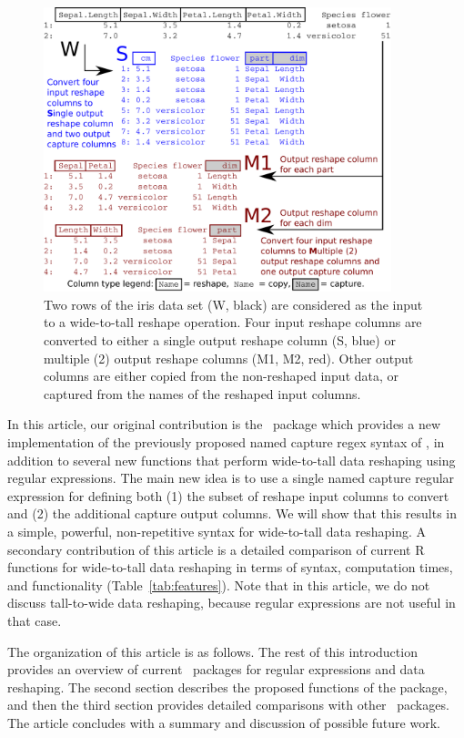 \begin{figure}
  \centering
  \includegraphics[width = 0.9\textwidth]{figure-1-iris}
  \caption{Two rows of the iris data set (W, black) are considered as
    the input to a wide-to-tall reshape operation. Four input reshape
    columns are converted to either a single output reshape column (S,
    blue) or multiple (2) output reshape columns (M1, M2, red). Other
    output columns are either copied from the non-reshaped input data,
    or captured from the names of the reshaped input columns.}
  \label{fig:wide-to-tall}
\end{figure}

In this article, our original contribution is the \R\ package
 which provides a new implementation of the previously
proposed named capture regex syntax of
\citet{HOCKING2019-namedCapture}, in addition to several new functions
that perform wide-to-tall data reshaping using regular
expressions.
The main new idea is to use a single
named capture regular expression for defining both (1) the subset of
reshape input columns to convert and (2) the additional capture
output columns. We will show that this results in a simple, powerful,
non-repetitive syntax for wide-to-tall data reshaping.
A secondary contribution of this article is a detailed
comparison of current R functions for wide-to-tall data reshaping in terms of
syntax, computation times, and functionality
(Table~\ref{tab:features}).
Note that in this article, we do not discuss tall-to-wide data reshaping,
because regular expressions are not useful in that case.

The organization of this article is as follows. The rest of this
introduction provides an overview of current \R\ packages for regular
expressions and data reshaping. The second section describes the
proposed functions of the  package, and then the third section
provides detailed comparisons with other \R\ packages. The article
concludes with a summary and discussion of possible future work.

